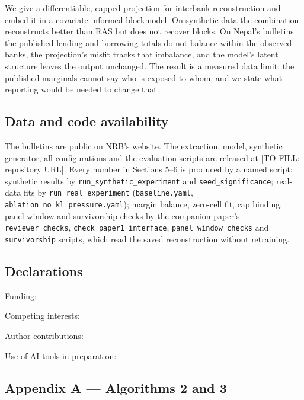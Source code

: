 \documentclass[
  a4paper,
]{article}
\begin{document}
We give a differentiable, capped projection for interbank reconstruction
and embed it in a covariate-informed blockmodel. On synthetic data the
combination reconstructs better than RAS but does not recover blocks. On
Nepal's bulletins the published lending and borrowing totals do not
balance within the observed banks, the projection's misfit tracks that
imbalance, and the model's latent structure leaves the output unchanged.
The result is a measured data limit: the published marginals cannot say
who is exposed to whom, and we state what reporting would be needed to
change that.

\subsection*{Data and code
availability}\label{data-and-code-availability}

The bulletins are public on NRB's website. The extraction, model,
synthetic generator, all configurations and the evaluation scripts are
released at {[}TO FILL: repository URL{]}. Every number in Sections 5--6
is produced by a named script: synthetic results by
\texttt{run\_synthetic\_experiment} and \texttt{seed\_significance};
real-data fits by \texttt{run\_real\_experiment}
(\texttt{baseline.yaml}, \texttt{ablation\_no\_kl\_pressure.yaml});
margin balance, zero-cell fit, cap binding, panel window and
survivorship checks by the companion paper's \texttt{reviewer\_checks},
\texttt{check\_paper1\_interface}, \texttt{panel\_window\_checks} and
\texttt{survivorship} scripts, which read the saved reconstruction
without retraining.

\subsection*{Declarations}\label{declarations}

Funding:

Competing interests:

Author contributions:

Use of AI tools in preparation:

\subsection*{Appendix A --- Algorithms 2 and
3}\label{appendix-a-algorithms-2-and-3}
\end{document}
